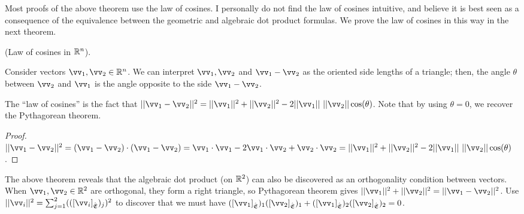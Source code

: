 Most proofs of the above theorem use the law of cosines. I personally do not find the law of cosines intuitive, and believe it is best seen as a consequence of the equivalence between the geometric and algebraic dot product formulas. We prove the law of cosines in this way in the next theorem.

\begin{theorem}
\label{ch::lin_alg::thm::law_of_cosines}
    (Law of cosines in $\mathbb{R}^n$). 
    
    Consider vectors $\vv_1, \vv_2 \in \R^n$. We can interpret $\vv_1, \vv_2$ and $\vv_1 - \vv_2$ as the oriented side lengths of a triangle; then, the angle $\theta$ between $\vv_2$ and $\vv_1$ is the angle opposite to the side $\vv_1 - \vv_2$.

    The ``law of cosines'' is the fact that $||\vv_1 - \vv_2||^2 = ||\vv_1||^2 + ||\vv_2||^2 - 2 ||\vv_1|| \spc ||\vv_2|| \cos(\theta)$. Note that by using $\theta = 0$, we recover the Pythagorean theorem.
\end{theorem}

\begin{proof}
   $||\vv_1 - \vv_2||^2 = (\vv_1 - \vv_2) \cdot (\vv_1 - \vv_2) = \vv_1 \cdot \vv_1 - 2 \vv_1 \cdot \vv_2 + \vv_2 \cdot \vv_2 = ||\vv_1||^2 + ||\vv_2||^2 - 2 ||\vv_1|| \spc ||\vv_2|| \cos(\theta)$.
\end{proof}

\begin{remark}
    The above theorem reveals that the algebraic dot product (on $\mathbb{R}^2$) can also be discovered as an orthogonality condition between vectors. When $\vv_1, \vv_2 \in \R^2$ are orthogonal, they form a right triangle, so Pythagorean theorem gives $||\vv_1||^2 + ||\vv_2||^2 = ||\vv_1 - \vv_2||^2$. Use $||\vv_i||^2 = \sum_{j = 1}^2 (([\vv_i]_\sE)_j)^2$ to discover that we must have $([\vv_1]_\sE)_1 ([\vv_2]_\sE)_1 + ([\vv_1]_\sE)_2 ([\vv_2]_\sE)_2 = 0$.
\end{remark}

